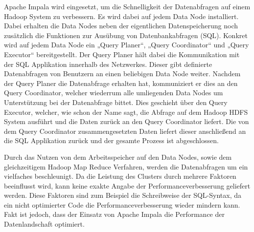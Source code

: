 Apache Impala wird eingesetzt, um die Schnelligkeit der Datenabfragen auf einem
Hadoop System zu verbessern. Es wird dabei auf jedem Data Node installiert.
Dabei erhalten die Data Nodes neben der eigentlichen Datenspeicherung noch
zusätzlich die Funktionen zur Ausübung von Datenbankabfragen (SQL). Konkret
wird auf jedem Data Node ein „Query Planer“, „Query Coordinator“ und „Query
Executor“ bereitgestellt. Der Query Planer hält dabei die Kommunikation mit der
SQL Applikation innerhalb des Netzwerkes.  Dieser gibt definierte Datenabfragen
von Benutzern an einen beliebigen Data Node weiter. Nachdem der Query Planer
die Datenabfrage erhalten hat, kommuniziert er dies an den Query Coordinator,
welcher wiederrum alle umliegenden Data Nodes um Unterstützung bei der
Datenabfrage bittet. Dies geschieht über den Query Executor, welcher, wie
schon der Name sagt, die Abfrage auf dem Hadoop HDFS System ausführt und die
Daten zurück an den Query Coordinator liefert. Die von dem Query Coordinator
zusammengesetzten Daten liefert dieser anschließend an die SQL Applikation
zurück und der gesamte Prozess ist abgeschlossen.

Durch das Nutzen von dem Arbeitsspeicher auf den Data Nodes, sowie dem
gleichzeitigem Hadoop Map Reduce Verfahren, werden die Datenabfragen um ein
vielfaches beschleunigt. Da die Leistung des Clusters durch mehrere Faktoren
beeinflusst wird, kann keine exakte Angabe der Performanceverbesserung
geliefert werden. Diese Faktoren sind zum Beispiel die Schreibweise der
SQL-Syntax, da ein nicht optimierter Code die Performanceverbesserung wieder
mindern kann. Fakt ist jedoch, dass der Einsatz von Apache Impala die
Performance der Datenlandschaft optimiert.
\nl%

